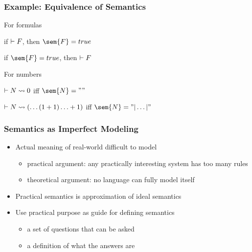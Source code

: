 \begin{frame}\frametitle{Example: Equivalence of Semantics}
\begin{blockitems}{For formulas}
\item if $\vdash F$, then $\sem{F}=true$ 
\item if $\sem{F}=true$, then $\vdash F$
\end{blockitems}

\begin{blockitems}{For numbers}
\item $\vdash N\rightsquigarrow 0$ iff $\sem{N}=""$
\item $\vdash N\rightsquigarrow (\ldots(1+1)\ldots+1)$ iff $\sem{N}="|\ldots|"$
\end{blockitems}
\end{frame}

\begin{frame}\frametitle{Semantics as Imperfect Modeling}
\begin{itemize}
 \item Actual meaning of real-world difficult to model
 \begin{itemize}
 \item practical argument: any practically interesting system has too many rules
 \item theoretical argument: no language can fully model itself
 \end{itemize}
 \item Practical semantics is approximation of ideal semantics
 \item Use practical purpose as guide for defining semantics
  \begin{itemize}
   \item a set of questions that can be asked 
   \item a definition of what the answers are
  \end{itemize}
\end{itemize}
\end{frame}


